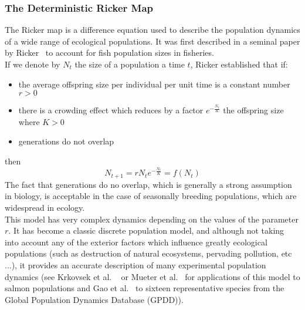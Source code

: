 \documentclass[12pt]{article}
\begin{document}
	\subsubsection{The Deterministic Ricker Map}
	The Ricker map is a difference equation used to describe the population dynamics of a wide range of ecological populations. It was first described in a seminal paper by Ricker~\cite{Ricker1954} to account for fish population sizes in fisheries. \\
	If we denote by $N_t$ the size of a population a time $t$, Ricker established that if:
	\begin{itemize}
		\item the average offspring size per individual per unit time is a constant number $r > 0$
		\item there is a crowding effect which reduces by a factor $e^{-\frac{N_t}{K}}$ the offspring size where $K > 0$
		\item generations do not overlap
	\end{itemize}
	then 
	\begin{equation}
		N_{t+1} = r N_t e^{-\frac{N_t}{K}} = f(N_t)
		\label{eq:ricker}
	\end{equation}
	The fact that generations do no overlap, which is generally a strong assumption in biology, is acceptable in the case of seasonally breeding populations, which are widespread in ecology. \\
	This model has very complex dynamics depending on the values of the parameter $r$. It has become a classic discrete population model, and although not taking into account any of the exterior factors which influence greatly ecological populations (such as destruction of natural ecosystems, pervading pollution, etc ...), it provides an accurate description of many experimental population dynamics (see Krkovsek et al. ~\cite{krkovsek2007declining} or Mueter et al.~\cite{mueter2002opposite} for applications of this model to salmon populations and Gao et al.~\cite{gao2012bayesian} to sixteen representative species from the Global Population Dynamics Database (GPDD)). \\
	
\end{document}
